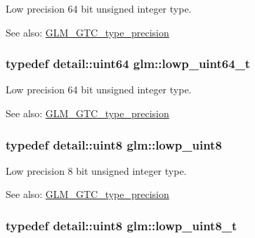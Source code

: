 Low precision 64 bit unsigned integer type. \begin{Desc}
\item[See also:]\hyperlink{group__gtc__type__precision}{GLM\_\-GTC\_\-type\_\-precision} \end{Desc}
\hypertarget{group__gtc__type__precision_gbf3069d4f188557a87b1d7f35eb0a270}{
\subsubsection[lowp\_\-uint64\_\-t]{\setlength{\rightskip}{0pt plus 5cm}typedef detail::uint64 {\bf glm::lowp\_\-uint64\_\-t}}}
\label{group__gtc__type__precision_gbf3069d4f188557a87b1d7f35eb0a270}


Low precision 64 bit unsigned integer type. \begin{Desc}
\item[See also:]\hyperlink{group__gtc__type__precision}{GLM\_\-GTC\_\-type\_\-precision} \end{Desc}
\hypertarget{group__gtc__type__precision_g4d9dc08b7b248a386dfe9afd00fc6b1e}{
\subsubsection[lowp\_\-uint8]{\setlength{\rightskip}{0pt plus 5cm}typedef detail::uint8 {\bf glm::lowp\_\-uint8}}}
\label{group__gtc__type__precision_g4d9dc08b7b248a386dfe9afd00fc6b1e}


Low precision 8 bit unsigned integer type. \begin{Desc}
\item[See also:]\hyperlink{group__gtc__type__precision}{GLM\_\-GTC\_\-type\_\-precision} \end{Desc}
\hypertarget{group__gtc__type__precision_g0910ef24195d1b8b26e34d73148c0c45}{
\subsubsection[lowp\_\-uint8\_\-t]{\setlength{\rightskip}{0pt plus 5cm}typedef detail::uint8 {\bf glm::lowp\_\-uint8\_\-t}}}
\label{group__gtc__type__precision_g0910ef24195d1b8b26e34d73148c0c45}


